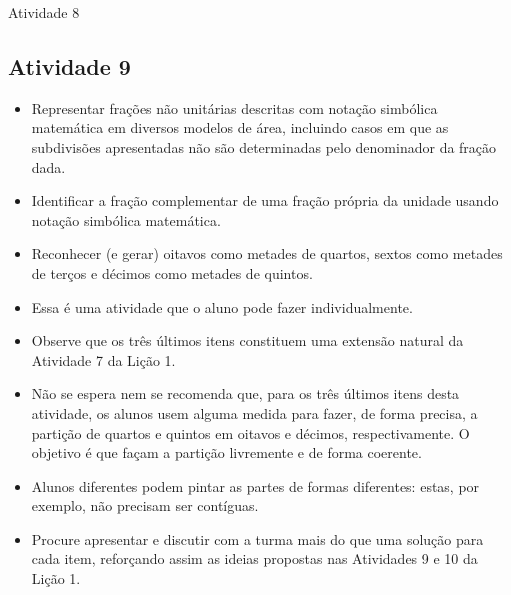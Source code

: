 \begin{multicols}{2}
\begin{resposta*}{Atividade 8}
\end{resposta*}

\subsection{Atividade 9}

   \vspace{.1cm}

  \begin{itemize} %
    \item       Representar frações não unitárias descritas com notação simbólica matemática em diversos modelos de área, incluindo casos em que as subdivisões apresentadas não são determinadas pelo denominador da fração dada.
    \item       Identificar a fração complementar de uma fração própria da unidade usando notação simbólica matemática.
    \item       Reconhecer (e gerar) oitavos como metades de quartos, sextos como metades de terços e décimos como metades de quintos.
\end{itemize} %


  \vspace{.1cm} 
  
  \vspace{.1cm}
  
\begin{itemize} %
    \item       Essa é uma atividade que o aluno pode fazer individualmente.
    \item       Observe que os três últimos itens constituem uma extensão natural da Atividade 7 da Lição 1.
    \item       Não se espera nem se recomenda que, para os três últimos itens desta atividade, os alunos usem alguma medida para fazer, de forma precisa, a partição de quartos e quintos em oitavos e décimos, respectivamente. O objetivo é que façam a partição livremente e de forma coerente.
    \item       Alunos diferentes podem pintar as partes de formas diferentes: estas, por exemplo, não precisam ser contíguas.
    \item       Procure apresentar e discutir com a turma mais do que uma solução para cada item, reforçando assim as ideias propostas nas Atividades 9 e 10 da Lição 1.
\end{itemize} %



\end{multicols}
